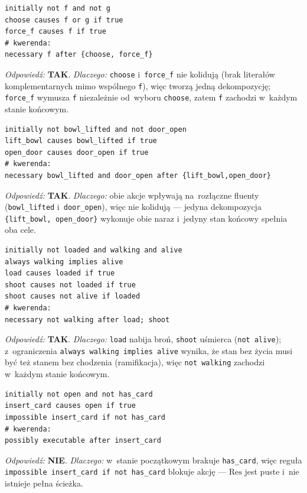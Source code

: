\documentclass[11pt,a4paper]{article}
\newcommand{\Res}{\mathrm{Res}}
\begin{document}
\begin{lstlisting}[style=ds4code, caption={Efekt alternatywny wsparty akcją --- akcja złożona bez konfliktu (rodzina scenario)}]
initially not f and not g
choose causes f or g if true
force_f causes f if true
# kwerenda:
necessary f after {choose, force_f}
\end{lstlisting}
\emph{Odpowiedź:} \textbf{TAK}. \emph{Dlaczego:} \texttt{choose} i~\texttt{force\_f}
nie kolidują (brak literałów komplementarnych mimo wspólnego \texttt{f}), więc
tworzą jedną dekompozycję; \texttt{force\_f} wymusza \texttt{f} niezależnie
od~wyboru \texttt{choose}, zatem \texttt{f} zachodzi w~każdym stanie końcowym.

\begin{lstlisting}[style=ds4code, caption={Niezależne akcje współbieżne --- brak konfliktu (rodzina scenario)}]
initially not bowl_lifted and not door_open
lift_bowl causes bowl_lifted if true
open_door causes door_open if true
# kwerenda:
necessary bowl_lifted and door_open after {lift_bowl,open_door}
\end{lstlisting}
\emph{Odpowiedź:} \textbf{TAK}. \emph{Dlaczego:} obie akcje wpływają na~rozłączne
fluenty (\texttt{bowl\_lifted} i~\texttt{door\_open}), więc nie kolidują ---
jedyna dekompozycja \texttt{\{lift\_bowl, open\_door\}} wykonuje obie naraz
i~jedyny stan końcowy spełnia oba cele.

\begin{lstlisting}[style=ds4code, caption={Indyk --- ramifikacja przez always (rodzina scenario)}]
initially not loaded and walking and alive
always walking implies alive
load causes loaded if true
shoot causes not loaded if true
shoot causes not alive if loaded
# kwerenda:
necessary not walking after load; shoot
\end{lstlisting}
\emph{Odpowiedź:} \textbf{TAK}. \emph{Dlaczego:} \texttt{load} nabija broń,
\texttt{shoot} uśmierca (\texttt{not alive}); z~ograniczenia
\texttt{always walking implies alive} wynika, że stan bez życia musi być też
stanem bez chodzenia (ramifikacja), więc \texttt{not walking} zachodzi w~każdym
stanie końcowym.

\begin{lstlisting}[style=ds4code, caption={Karta i drzwi --- akcja zablokowana (rodzina scenario)}]
initially not open and not has_card
insert_card causes open if true
impossible insert_card if not has_card
# kwerenda:
possibly executable after insert_card
\end{lstlisting}
\emph{Odpowiedź:} \textbf{NIE}. \emph{Dlaczego:} w~stanie początkowym brakuje
\texttt{has\_card}, więc reguła \texttt{impossible insert\_card if not has\_card}
blokuje akcję --- $\Res$ jest puste i~nie istnieje pełna ścieżka.
\end{document}

